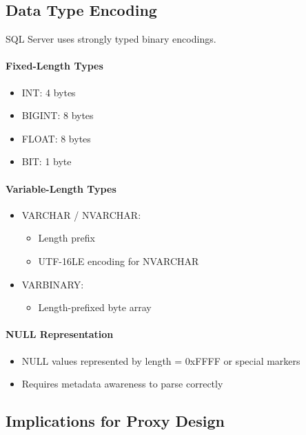 \subsection{Data Type Encoding}

SQL Server uses strongly typed binary encodings.

\paragraph{Fixed-Length Types}

\begin{itemize}
    \item INT: 4 bytes
    \item BIGINT: 8 bytes
    \item FLOAT: 8 bytes
    \item BIT: 1 byte
\end{itemize}

\paragraph{Variable-Length Types}

\begin{itemize}
    \item VARCHAR / NVARCHAR:
    \begin{itemize}
        \item Length prefix
        \item UTF-16LE encoding for NVARCHAR
    \end{itemize}
    
    \item VARBINARY:
    \begin{itemize}
        \item Length-prefixed byte array
    \end{itemize}
\end{itemize}

\paragraph{NULL Representation}

\begin{itemize}
    \item NULL values represented by length = 0xFFFF or special markers
    \item Requires metadata awareness to parse correctly
\end{itemize}

\subsection{Implications for Proxy Design}


